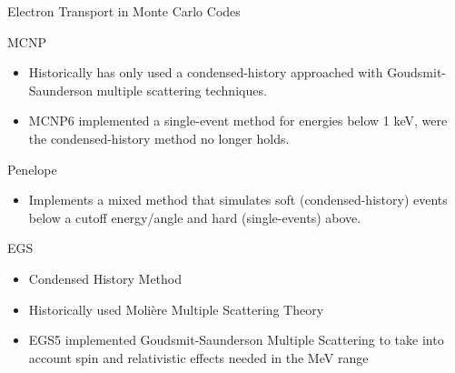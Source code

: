 \documentclass{beamer}
\begin{document}
\begin{frame}{Electron Transport in Monte Carlo Codes}

  \begin{block}{MCNP}
    \begin{itemize}
      \item Historically has only used a condensed-history approached with Goudsmit-Saunderson multiple scattering techniques.
      \item MCNP6 implemented a single-event method for energies below 1 keV, 
              were the condensed-history method no longer holds.
    \end{itemize}
  \end{block}
    
  \begin{block}{Penelope}
    \begin{itemize}
      \item Implements a mixed method that simulates soft (condensed-history) 
              events below a cutoff energy/angle and hard (single-events) above.
    \end{itemize}    
  \end{block}

  \begin{block}{EGS}
    \begin{itemize}
      \item Condensed History Method
      \item Historically used Moli\`ere Multiple Scattering Theory
      \item EGS5 implemented Goudsmit-Saunderson Multiple Scattering to take into account spin and relativistic effects needed in the MeV range
    \end{itemize}    
  \end{block}
    

\end{frame}
\end{document}

